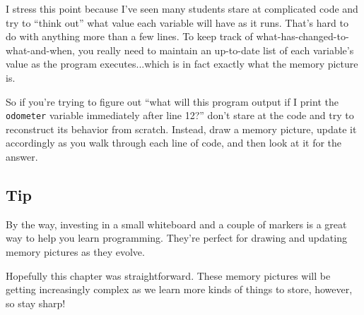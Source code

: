 I stress this point because I've seen many students stare at complicated code
and try to ``think out'' what value each variable will have as it runs. That's
hard to do with anything more than a few lines. To keep track of
what-has-changed-to-what-and-when, you really need to maintain an up-to-date
list of each variable's value as the program executes...which is in fact
exactly what the memory picture is.

So if you're trying to figure out ``what will this program output if I print
the \texttt{odometer} variable immediately after line 12?'' don't stare at the
code and try to reconstruct its behavior from scratch. Instead, draw a memory
picture, update it accordingly as you walk through each line of code, and then
look at it for the answer.

\subsection{Tip}

By the way, investing in a small whiteboard and a couple of markers is a great
way to help you learn programming. They're perfect for drawing and updating
memory pictures as they evolve.

Hopefully this chapter was straightforward. These memory pictures will be
getting increasingly complex as we learn more kinds of things to store,
however, so stay sharp!
